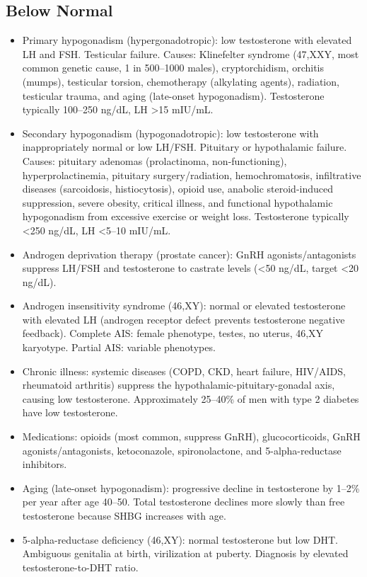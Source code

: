 \subsection*{Below Normal}
\begin{itemize}
  \item Primary hypogonadism (hypergonadotropic): low testosterone with elevated LH and FSH. Testicular failure. Causes: Klinefelter syndrome (47,XXY, most common genetic cause, 1 in 500--1000 males), cryptorchidism, orchitis (mumps), testicular torsion, chemotherapy (alkylating agents), radiation, testicular trauma, and aging (late-onset hypogonadism). Testosterone typically 100--250 ng/dL, LH >15 mIU/mL.
  \item Secondary hypogonadism (hypogonadotropic): low testosterone with inappropriately normal or low LH/FSH. Pituitary or hypothalamic failure. Causes: pituitary adenomas (prolactinoma, non-functioning), hyperprolactinemia, pituitary surgery/radiation, hemochromatosis, infiltrative diseases (sarcoidosis, histiocytosis), opioid use, anabolic steroid-induced suppression, severe obesity, critical illness, and functional hypothalamic hypogonadism from excessive exercise or weight loss. Testosterone typically <250 ng/dL, LH <5--10 mIU/mL.
  \item Androgen deprivation therapy (prostate cancer): GnRH agonists/antagonists suppress LH/FSH and testosterone to castrate levels (<50 ng/dL, target <20 ng/dL).
  \item Androgen insensitivity syndrome (46,XY): normal or elevated testosterone with elevated LH (androgen receptor defect prevents testosterone negative feedback). Complete AIS: female phenotype, testes, no uterus, 46,XY karyotype. Partial AIS: variable phenotypes.
  \item Chronic illness: systemic diseases (COPD, CKD, heart failure, HIV/AIDS, rheumatoid arthritis) suppress the hypothalamic-pituitary-gonadal axis, causing low testosterone. Approximately 25--40\% of men with type 2 diabetes have low testosterone.
  \item Medications: opioids (most common, suppress GnRH), glucocorticoids, GnRH agonists/antagonists, ketoconazole, spironolactone, and 5-alpha-reductase inhibitors.
  \item Aging (late-onset hypogonadism): progressive decline in testosterone by 1--2\% per year after age 40--50. Total testosterone declines more slowly than free testosterone because SHBG increases with age.
  \item 5-alpha-reductase deficiency (46,XY): normal testosterone but low DHT. Ambiguous genitalia at birth, virilization at puberty. Diagnosis by elevated testosterone-to-DHT ratio.
\end{itemize}

